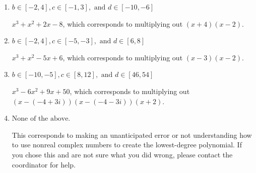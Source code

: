 \documentclass{extbook}[14pt]
\begin{document}
\begin{enumerate}
{\begin{enumerate}[label=\Alph*.]
* $x^{3} +6 x^{2} +9 x -50$, which is the correct option.
\item \( b \in [-2, 4], c \in [-1, 3], \text{ and } d \in [-10, -6] \)

$x^{3} + x^{2} +2 x -8$, which corresponds to multiplying out $(x + 4)(x -2)$.
\item \( b \in [-2, 4], c \in [-5, -3], \text{ and } d \in [6, 8] \)

$x^{3} + x^{2} -5 x + 6$, which corresponds to multiplying out $(x -3)(x -2)$.
\item \( b \in [-10, -5], c \in [8, 12], \text{ and } d \in [46, 54] \)

$x^{3} -6 x^{2} +9 x + 50$, which corresponds to multiplying out $(x-(-4 + 3 i))(x-(-4 - 3 i))(x + 2)$.
\item \( \text{None of the above.} \)

This corresponds to making an unanticipated error or not understanding how to use nonreal complex numbers to create the lowest-degree polynomial. If you chose this and are not sure what you did wrong, please contact the coordinator for help.
\end{enumerate}

}
\end{enumerate}
\end{document}
